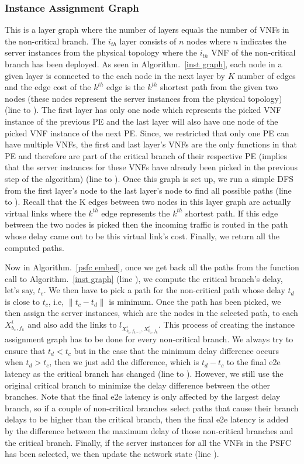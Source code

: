 \documentclass[journal]{IEEEtran}
\begin{document}
\subsubsection{Instance Assignment Graph}
This is a layer graph where the number of layers equals the number of VNFs in the non-critical branch. The $i_{th}$ layer consists of $n$ nodes where $n$ indicates the server instances from the physical topology where the $i_{th}$ VNF of the non-critical branch has been deployed. As seen in Algorithm.~\ref{inst graph}, each node in a given layer is connected to the each node in the next layer by $K$ number of edges and the edge cost of the $k^{th}$ edge is the $k^{th}$ shortest path from the given two nodes (these nodes represent the server instances from the physical topology) (line to ). The first layer has only one node which represents the picked VNF instance of the previous PE and the last layer will also have one node of the picked VNF instance of the next PE. Since, we restricted that only one PE can have multiple VNFs, the first and last layer's VNFs are the only functions in that PE and therefore are part of the critical branch of their respective PE (implies that the server instances for these VNFs have already been picked in the previous step of the algorithm) (line to ). Once this graph is set up, we run a simple DFS from the first layer's node to the last layer's node to find all possible paths (line to ). Recall that the K edges between two nodes in this layer graph are actually virtual links where the $k^{th}$ edge represents the $k^{th}$ shortest path. If this edge between the two nodes is picked then the incoming traffic is routed in the path whose delay came out to be this virtual link's cost. Finally, we return all the computed paths. 

Now in Algorithm.~\ref{psfc embed}, once we get back all the paths from the function call to Algorithm.~\ref{inst graph} (line ), we compute the critical branch's delay, let's say, $t_c$. We then have to pick a path for the non-critical path whose delay $t_d$ is close to $t_c$, i.e, $\lVert t_c - t_d \rVert$ is minimum. Once the path has been picked, we then assign the server instances, which are the nodes in the selected path, to each $X_{b_{x}, f_{k}}^{i}$ and also add the links to $l_{X_{b_{x}, f_{k-1}}^{i}, X_{b_{x}, f_{k}}^{i}}$. This process of creating the instance assignment graph has to be done for every non-critical branch. We always try to ensure that $t_d < t_c$ but in the case that the minimum delay difference occurs when $t_d > t_c$, then we just add the difference, which is $t_d - t_c$ to the final e2e latency as the critical branch has changed (line to ). However, we still use the original critical branch to minimize the delay difference between the other branches. Note that the final e2e latency is only affected by the largest delay branch, so if a couple of non-critical branches select paths that cause their branch delays to be higher than the critical branch, then the final e2e latency is added by the difference between the maximum delay of those non-critical branches and the critical branch. Finally, if the server instances for all the VNFs in the PSFC has been selected, we then update the network state (line ).\\
\end{document}
